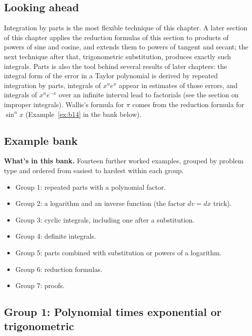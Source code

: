 \documentclass[11pt]{article}
\begin{document}
\subsection*{Looking ahead}

Integration by parts is the most flexible technique of this chapter. A later section of this chapter applies the reduction formulas of this section to products of powers of sine and cosine, and extends them to powers of tangent and secant; the next technique after that, trigonometric substitution, produces exactly such integrals. Parts is also the tool behind several results of later chapters: the integral form of the error in a Taylor polynomial is derived by repeated integration by parts, integrals of $x^ne^x$ appear in estimates of those errors, and integrals of $x^ne^{-x}$ over an infinite interval lead to factorials (see the section on improper integrals). Wallis's formula for $\pi$ comes from the reduction formula for $\sin^nx$ (Example~\ref{ex:b14} in the bank below).

\subsection*{Example bank}

\textbf{What's in this bank.} Fourteen further worked examples, grouped by problem type and ordered from easiest to hardest within each group.
\begin{itemize}[nosep]
  \item Group 1: repeated parts with a polynomial factor.
  \item Group 2: a logarithm and an inverse function (the factor $dv=dx$ trick).
  \item Group 3: cyclic integrals, including one after a substitution.
  \item Group 4: definite integrals.
  \item Group 5: parts combined with substitution or powers of a logarithm.
  \item Group 6: reduction formulas.
  \item Group 7: proofs.
\end{itemize}

\subsection*{Group 1: Polynomial times exponential or trigonometric}
\end{document}
